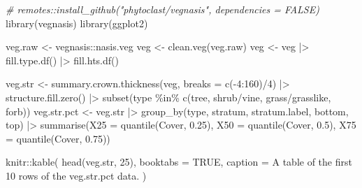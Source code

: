 \documentclass[
]{book}
\newenvironment{Shaded}{\begin{snugshade}}{\end{snugshade}}
\newcommand{\AttributeTok}[1]{\textcolor[rgb]{0.77,0.63,0.00}{#1}}
\newcommand{\CommentTok}[1]{\textcolor[rgb]{0.56,0.35,0.01}{\textit{#1}}}
\newcommand{\ConstantTok}[1]{\textcolor[rgb]{0.00,0.00,0.00}{#1}}
\newcommand{\DecValTok}[1]{\textcolor[rgb]{0.00,0.00,0.81}{#1}}
\newcommand{\FloatTok}[1]{\textcolor[rgb]{0.00,0.00,0.81}{#1}}
\newcommand{\FunctionTok}[1]{\textcolor[rgb]{0.00,0.00,0.00}{#1}}
\newcommand{\NormalTok}[1]{#1}
\newcommand{\OtherTok}[1]{\textcolor[rgb]{0.56,0.35,0.01}{#1}}
\newcommand{\SpecialCharTok}[1]{\textcolor[rgb]{0.00,0.00,0.00}{#1}}
\newcommand{\StringTok}[1]{\textcolor[rgb]{0.31,0.60,0.02}{#1}}
\begin{document}
\begin{Shaded}
\begin{Highlighting}[]
\CommentTok{\# remotes::install\_github("phytoclast/vegnasis", dependencies = FALSE)}
\FunctionTok{library}\NormalTok{(vegnasis)}
\FunctionTok{library}\NormalTok{(ggplot2)}

\NormalTok{veg.raw }\OtherTok{\textless{}{-}}\NormalTok{ vegnasis}\SpecialCharTok{::}\NormalTok{nasis.veg}
\NormalTok{veg }\OtherTok{\textless{}{-}} \FunctionTok{clean.veg}\NormalTok{(veg.raw)}
\NormalTok{veg }\OtherTok{\textless{}{-}}\NormalTok{ veg }\SpecialCharTok{|\textgreater{}} \FunctionTok{fill.type.df}\NormalTok{() }\SpecialCharTok{|\textgreater{}} \FunctionTok{fill.hts.df}\NormalTok{()}

\NormalTok{veg.str }\OtherTok{\textless{}{-}} \FunctionTok{summary.crown.thickness}\NormalTok{(veg, }\AttributeTok{breaks =} \FunctionTok{c}\NormalTok{(}\SpecialCharTok{{-}}\DecValTok{4}\SpecialCharTok{:}\DecValTok{160}\NormalTok{)}\SpecialCharTok{/}\DecValTok{4}\NormalTok{) }\SpecialCharTok{|\textgreater{}} \FunctionTok{structure.fill.zero}\NormalTok{() }\SpecialCharTok{|\textgreater{}} \FunctionTok{subset}\NormalTok{(type }\SpecialCharTok{\%in\%} \FunctionTok{c}\NormalTok{(}\StringTok{\textquotesingle{}tree\textquotesingle{}}\NormalTok{, }\StringTok{\textquotesingle{}shrub/vine\textquotesingle{}}\NormalTok{, }\StringTok{\textquotesingle{}grass/grasslike\textquotesingle{}}\NormalTok{,  }\StringTok{\textquotesingle{}forb\textquotesingle{}}\NormalTok{))}
\NormalTok{veg.str.pct }\OtherTok{\textless{}{-}}\NormalTok{ veg.str }\SpecialCharTok{|\textgreater{}} \FunctionTok{group\_by}\NormalTok{(type, stratum, stratum.label, bottom, top) }\SpecialCharTok{|\textgreater{}}
  \FunctionTok{summarise}\NormalTok{(}\AttributeTok{X25 =} \FunctionTok{quantile}\NormalTok{(Cover, }\FloatTok{0.25}\NormalTok{),}
            \AttributeTok{X50 =} \FunctionTok{quantile}\NormalTok{(Cover, }\FloatTok{0.5}\NormalTok{),}
            \AttributeTok{X75 =} \FunctionTok{quantile}\NormalTok{(Cover, }\FloatTok{0.75}\NormalTok{))}

\NormalTok{knitr}\SpecialCharTok{::}\FunctionTok{kable}\NormalTok{(}
  \FunctionTok{head}\NormalTok{(veg.str, }\DecValTok{25}\NormalTok{), }\AttributeTok{booktabs =} \ConstantTok{TRUE}\NormalTok{,}
  \AttributeTok{caption =} \StringTok{\textquotesingle{}A table of the first 10 rows of the veg.str.pct data.\textquotesingle{}}
\NormalTok{)}
\end{Highlighting}
\end{Shaded}
\end{document}
